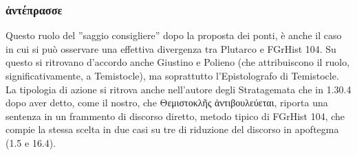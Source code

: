 {    \subsubsection{\textgreek{ἀντέπρασσε}}\label{anteprasse}
    Questo ruolo del ''saggio consigliere'' dopo la proposta dei ponti, è anche il caso in cui si può osservare una effettiva divergenza tra Plutarco e FGrHist 104.  Su questo si ritrovano d'accordo anche  Giustino e Polieno (che attribuiscono il ruolo, significativamente, a Temistocle), ma soprattutto l'Epistolografo di Temistocle. La tipologia di azione si ritrova anche nell'autore degli Stratagemata che in 1.30.4 dopo aver detto, come il nostro, che \textgreek{Θεμιστοκλῆς ἀντιβουλεύεται}, riporta una sentenza in un frammento di discorso diretto, metodo tipico di FGrHist 104, che compie la stessa scelta in due casi su tre di riduzione del discorso in apoftegma (1.5 e 16.4).
}
